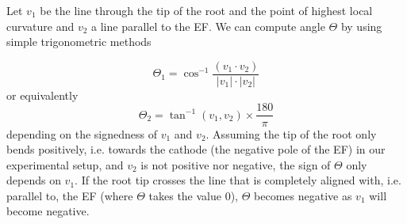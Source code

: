 %
%




Let \( v_{1} \) be the line through the tip of the root and the point of highest local curvature and \( v_{2} \) a line parallel to the EF. 
We can compute angle \( \Theta \)  by using simple trigonometric methods 

\begin{equation} \label{angle1}
\Theta_{1}  = \cos^{-1}\frac{( v_{1} \cdot v_{2}) }{ | v_{1} | \cdot | v_{2} |}
\end{equation}
or equivalently
\begin{equation} \label{angle2}
\Theta_{2} = \tan^{-1}( v_{1}, v_{2}) \times \frac{180}{\pi}
\end{equation}
depending on the signedness of \( v_{1} \) and \( v_{2} \). Assuming the tip of the root only bends positively, i.e. towards the cathode (the negative pole of the EF) in our experimental setup, and \( v_{2} \) is not positive nor negative, the sign of \( \Theta \) only depends on \( v_{1} \). If the root tip crosses the line that is completely aligned with, i.e. parallel to, the EF (where \( \Theta \) takes the value 0), \( \Theta \) becomes negative as \( v_{1} \) will become negative. 


